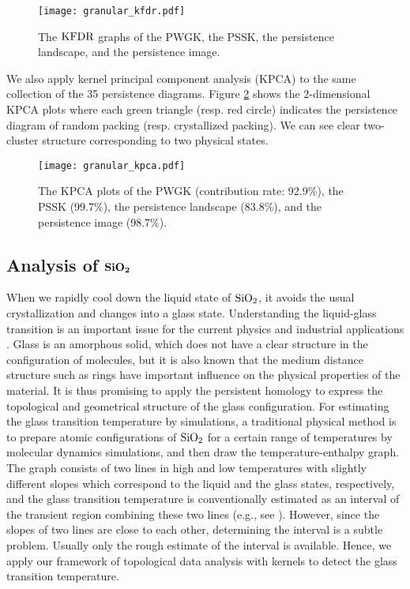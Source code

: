 \documentclass{article}
\newcommand{\KFDR}{{\rm KFDR}}
\begin{document}
\begin{figure}[htbp]
\begin{center}
\texttt{[image: granular\_kfdr.pdf]}
\end{center}
\vspace{-3mm}
\caption{The $\KFDR$ graphs of the PWGK, the PSSK, the persistence landscape, and the persistence image.}
\label{fig:packing_KFDR}
\end{figure}

We also apply kernel principal component analysis (KPCA) to the same collection of the 35 persistence diagrams. 
Figure \ref{fig:packing_kpca} shows the $2$-dimensional KPCA plots where each green triangle (resp. red circle) indicates the persistence diagram of random packing (resp. crystallized packing).
We can see clear two-cluster structure corresponding to two physical states.

\begin{figure}[htbp]
\begin{center}
\texttt{[image: granular\_kpca.pdf]}
\end{center}
\vspace{-3mm}
\caption{The KPCA plots of the PWGK (contribution rate: 92.9\%), the PSSK (99.7\%), the persistence landscape (83.8\%), and the persistence image (98.7\%).}
\label{fig:packing_kpca}
\end{figure}





\subsection{Analysis of ${\rm {\bf SiO_2}}$}
\label{subsec:glass}

When we rapidly cool down the liquid state of ${\rm SiO}_2$, it avoids the usual crystallization and changes into a glass state. 
Understanding the liquid-glass transition is an important issue for the current physics and industrial applications \cite{GS07}.
Glass is an amorphous solid, which does not have a clear structure in the configuration of molecules, but it is also known that the medium distance structure such as rings have important influence on the physical properties of the material.
It is thus promising to apply the persistent homology to express the topological and geometrical structure of the glass configuration.
For estimating the glass transition temperature by simulations, a traditional physical method is to prepare atomic configurations of ${\rm SiO_{2}}$ for a certain range of temperatures by molecular dynamics simulations, and then draw the temperature-enthalpy graph. 
The graph consists of two lines in high and low temperatures with slightly different slopes which correspond to the liquid and the glass states, respectively, and the glass transition temperature is conventionally estimated as an interval of the transient region combining these two lines
 (e.g., see \cite{El90}).
However, since the slopes of two lines are close to each other, determining the interval is a subtle problem.
Usually only the rough estimate of the interval is available. Hence, we apply our framework of topological data analysis with kernels to detect the glass transition temperature. 
\end{document}
